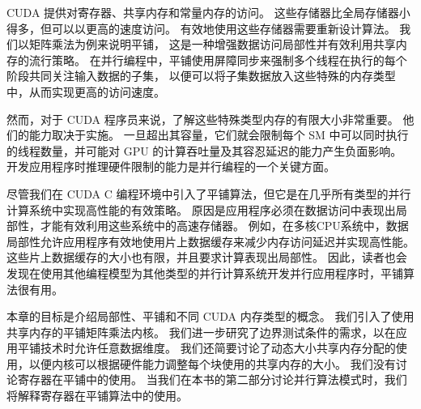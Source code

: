CUDA 提供对寄存器、共享内存和常量内存的访问。 这些存储器比全局存储器小得多，但可以以更高的速度访问。 
有效地使用这些存储器需要重新设计算法。 我们以矩阵乘法为例来说明平铺，
这是一种增强数据访问局部性并有效利用共享内存的流行策略。 
在并行编程中，平铺使用屏障同步来强制多个线程在执行的每个阶段共同关注输入数据的子集，
以便可以将子集数据放入这些特殊的内存类型中，从而实现更高的访问速度。

然而，对于 CUDA 程序员来说，了解这些特殊类型内存的有限大小非常重要。 他们的能力取决于实施。 
一旦超出其容量，它们就会限制每个 SM 中可以同时执行的线程数量，并可能对 GPU 的计算吞吐量及其容忍延迟的能力产生负面影响。 
开发应用程序时推理硬件限制的能力是并行编程的一个关键方面。

尽管我们在 CUDA C 编程环境中引入了平铺算法，但它是在几乎所有类型的并行计算系统中实现高性能的有效策略。 
原因是应用程序必须在数据访问中表现出局部性，才能有效利用这些系统中的高速存储器。 
例如，在多核CPU系统中，数据局部性允许应用程序有效地使用片上数据缓存来减少内存访问延迟并实现高性能。 
这些片上数据缓存的大小也有限，并且要求计算表现出局部性。 
因此，读者也会发现在使用其他编程模型为其他类型的并行计算系统开发并行应用程序时，平铺算法很有用。

本章的目标是介绍局部性、平铺和不同 CUDA 内存类型的概念。 我们引入了使用共享内存的平铺矩阵乘法内核。 
我们进一步研究了边界测试条件的需求，以在应用平铺技术时允许任意数据维度。 
我们还简要讨论了动态大小共享内存分配的使用，以便内核可以根据硬件能力调整每个块使用的共享内存的大小。 
我们没有讨论寄存器在平铺中的使用。 当我们在本书的第二部分讨论并行算法模式时，我们将解释寄存器在平铺算法中的使用。
